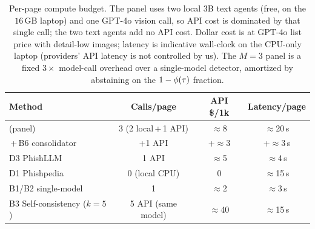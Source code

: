 \begin{table}[!h]
\caption{Per-page compute budget. The panel uses two local 3B text agents (free, on the
$16$\,GB laptop) and one GPT-4o vision call, so API cost is dominated by that single call;
the two text agents add no API cost. Dollar cost is at GPT-4o list price with detail-low
images; latency is indicative wall-clock on the CPU-only laptop (providers' API latency is
not controlled by us). The $M{=}3$ panel is a fixed $3\times$ model-call overhead over a
single-model detector, amortized by abstaining on the $1-\phi(\tau)$ fraction.}
\label{tab:cost}
\footnotesize
\setlength{\tabcolsep}{5pt}
\begin{tabular}{lccc}
\toprule
Method & Calls/page & API \$/1k & Latency/page \\
\midrule
\textbf{\toolname{}} (panel)    & 3 (2 local\,+\,1 API) & $\approx$8 & $\approx$20\,s \\
\;\,+\,B6 consolidator          & +1 API                & +$\approx$3 & +$\approx$3\,s \\
D3 PhishLLM                     & 1 API                 & $\approx$5 & $\approx$4\,s \\
D1 Phishpedia                   & 0 (local CPU)         & 0          & $\approx$15\,s \\
B1/B2 single-model              & 1                     & $\approx$2 & $\approx$3\,s \\
B3 Self-consistency ($k{=}5$)   & 5 API (same model)    & $\approx$40 & $\approx$15\,s \\
\bottomrule
\end{tabular}
\end{table}
